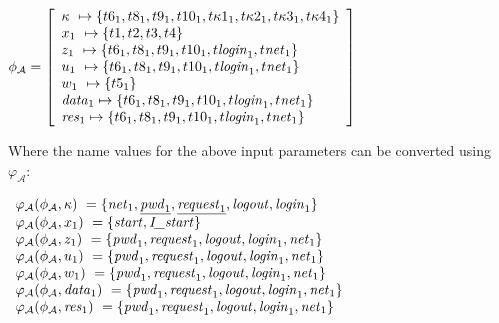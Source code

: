 \documentclass[10pt,a4paper,final,oneside,fleqn]{book}
\begin{document}
\noindent
$\phi_\mathcal{A}=\left[\begin{array}{l}
\kappa~\mapsto\{t6_1, t8_1, t9_1, t10_1, t\kappa 1_1, t\kappa 2_1, t\kappa 3_1, t\kappa 4_1\}\\
x_1~\mapsto\{t1, t2, t3, t4\}\\
z_1~\mapsto\{t6_1, t8_1, t9_1, t10_1, t\mbox{{\itshape login\/}}_1, t\mbox{{\itshape net\/}}_1\}\\
u_1~\mapsto\{t6_1, t8_1, t9_1, t10_1, t\mbox{{\itshape login\/}}_1, t\mbox{{\itshape net\/}}_1\}\\
w_1~\mapsto\{t5_1\}\\
\mbox{{\itshape data\/}}_1\mapsto\{t6_1, t8_1, t9_1, t10_1, t\mbox{{\itshape login\/}}_1, t\mbox{{\itshape net\/}}_1\}\\
\mbox{{\itshape res\/}}_1\mapsto\{t6_1, t8_1, t9_1, t10_1, t\mbox{{\itshape login\/}}_1, t\mbox{{\itshape net\/}}_1\}
\end{array}\right]$\vspace{6mm}

\noindent
Where the name values for the above input parameters can be converted using $\varphi_\mathcal{A}$:\vspace{6mm}

\noindent
$\begin{array}{l}
\varphi_\mathcal{A}(\phi_\mathcal{A},\kappa)~=\{\mbox{{\itshape net\/}}_1, \underline{\mbox{{\itshape pwd\/}}_1}, \underline{\mbox{{\itshape request\/}}_1}, \mbox{{\itshape logout\/}}, \mbox{{\itshape login\/}}_1\}\\
\varphi_\mathcal{A}(\phi_\mathcal{A},x_1)~=\{\mbox{{\itshape start\/}}, \mbox{{\itshape I\_start\/}}\}\\
\varphi_\mathcal{A}(\phi_\mathcal{A},z_1)~=\{\mbox{{\itshape pwd\/}}_1, \mbox{{\itshape request\/}}_1,\mbox{{\itshape logout\/}},\mbox{{\itshape login\/}}_1,\mbox{{\itshape net\/}}_1\}\\
\varphi_\mathcal{A}(\phi_\mathcal{A},u_1)~=\{\mbox{{\itshape pwd\/}}_1, \mbox{{\itshape request\/}}_1,\mbox{{\itshape logout\/}},\mbox{{\itshape login\/}}_1,\mbox{{\itshape net\/}}_1\}\\
\varphi_\mathcal{A}(\phi_\mathcal{A},w_1)~=\{\mbox{{\itshape pwd\/}}_1, \mbox{{\itshape request\/}}_1,\mbox{{\itshape logout\/}},\mbox{{\itshape login\/}}_1,\mbox{{\itshape net\/}}_1\}\\
\varphi_\mathcal{A}(\phi_\mathcal{A},\mbox{{\itshape data\/}}_1)~=\{\mbox{{\itshape pwd\/}}_1, \mbox{{\itshape request\/}}_1, \mbox{{\itshape logout\/}},\mbox{{\itshape login\/}}_1,\mbox{{\itshape net\/}}_1\}\\
\varphi_\mathcal{A}(\phi_\mathcal{A},\mbox{{\itshape res\/}}_1)~=\{\mbox{{\itshape pwd\/}}_1, \mbox{{\itshape request\/}}_1, \mbox{{\itshape logout\/}},\mbox{{\itshape login\/}}_1,\mbox{{\itshape net\/}}_1\}
\end{array}$\vspace{6mm}
\end{document}
